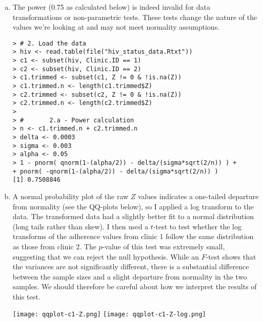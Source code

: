 \documentclass[a4paper, 10pt]{article}
\newcounter{prob_num}
\begin{document}
\begin{enumerate}[(a)]
\item The power (0.75 as calculated below) is indeed invalid for data transformations or non-parametric tests. These tests change the nature of the values we're looking at and may not meet normality assumptions.
{\scriptsize \begin{verbatim}
> # 2. Load the data
> hiv <- read.table(file("hiv_status_data.Rtxt"))
> c1 <- subset(hiv, Clinic.ID == 1)
> c2 <- subset(hiv, Clinic.ID == 2)
> c1.trimmed <- subset(c1, Z != 0 & !is.na(Z))
> c1.trimmed.n <- length(c1.trimmed$Z)
> c2.trimmed <- subset(c2, Z != 0 & !is.na(Z))
> c2.trimmed.n <- length(c2.trimmed$Z)
> 
> #       2.a - Power calculation
> n <- c1.trimmed.n + c2.trimmed.n
> delta <- 0.0003
> sigma <- 0.003
> alpha <- 0.05
> 1 - pnorm( qnorm(1-(alpha/2)) - delta/(sigma*sqrt(2/n)) ) +
+ pnorm( -qnorm(1-(alpha/2)) - delta/(sigma*sqrt(2/n)) )
[1] 0.7508846
\end{verbatim} }

\item A normal probability plot of the raw $Z$ values indicates a one-tailed departure from normality (see the QQ-plots below), so I applied a log transform to the data. The transformed data had a slightly better fit to a normal distribution (long tails rather than skew). I then used a $t$-test to test whether the log transforms of the adherence values from clinic 1 follow the same distribution as those from clinic 2. The $p$-value of this test was extremely small, suggesting that we can reject the null hypothesis. While an $F$-test shows that the variances are not significantly different, there is a substantial difference between the sample sizes and a slight departure from normality in the two samples. We should therefore be careful about how we interpret the results of this test.

\begin{center}
  \texttt{[image: qqplot-c1-Z.png]}
  \texttt{[image: qqplot-c1-Z-log.png]}
\end{center}


\end{enumerate}
\end{document}
